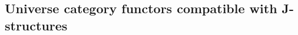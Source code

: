 \documentclass[12pt]{article}
\numberwithin{equation}{section}
\begin{document}
\subsection{Universe category functors compatible with J-structures}
\end{document}

